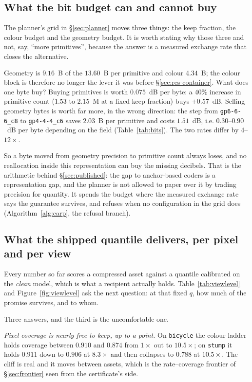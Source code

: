 \documentclass[preprint,number,3p]{elsarticle}
\begin{document}
\subsection{What the bit budget can and cannot buy}
\label{sec:midrate-bound}

The planner's grid in \S\ref{sec:planner} moves three things: the keep fraction, the colour budget and the geometry
budget. It is worth stating why those three and not, say, ``more primitives'', because the answer is a measured
exchange rate that closes the alternative.

Geometry is $9.16$~B of the $13.60$~B per primitive and colour $4.34$~B; the colour block is therefore no longer the
lever it was before \S\ref{sec:res-container}. What does one byte buy? Buying primitives is worth $0.075$~dB per byte:
a $40\%$ increase in primitive count ($1.53$ to $2.15$~M at a fixed keep fraction) buys $+0.57$~dB. Selling geometry
bytes is worth far more, in the wrong direction: the step from \texttt{gp6-6-6\_c8} to \texttt{gp4-4-4\_c6} saves
$2.03$~B per primitive and costs $1.51$~dB, i.e. $0.30$--$0.90$~dB per byte depending on the field
(Table~\ref{tab:bits}). The two rates differ by $4$--$12\times$.

So a byte moved from geometry precision to primitive count always loses, and no reallocation inside this
representation can buy the missing decibels. That is the arithmetic behind \S\ref{sec:published}: the gap to
anchor-based coders is a representation gap, and the planner is not allowed to paper over it by trading precision for
quantity. It spends the budget where the measured exchange rate says the guarantee survives, and refuses when no
configuration in the grid does (Algorithm~\ref{alg:carp}, the refusal branch).

\subsection{What the shipped quantile delivers, per pixel and per view}
\label{sec:viewlevel}

Every number so far scores a compressed asset against a quantile calibrated on the \emph{clean} model, which is what
a recipient actually holds. Table~\ref{tab:viewlevel} and Figure~\ref{fig:viewlevel} ask the next question: at that
fixed $q$, how much of the promise survives, and to whom.

Three answers, and the third is the uncomfortable one.

\emph{Pixel coverage is nearly free to keep, up to a point.} On \texttt{bicycle} the colour ladder holds coverage
between $0.910$ and $0.874$ from $1\times$ out to $10.5\times$; on \texttt{stump} it holds $0.911$ down to $0.906$ at
$8.3\times$ and then collapses to $0.788$ at $10.5\times$. The cliff is real and it moves between assets, which is
the rate--coverage frontier of \S\ref{sec:frontier} seen from the certificate's side.
\end{document}
